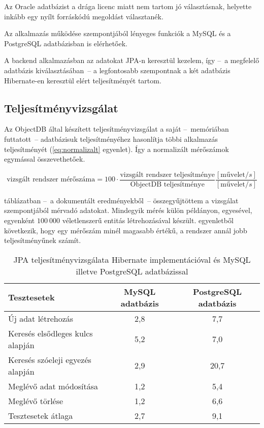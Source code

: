 Az Oracle adatbázist a drága licenc miatt nem tartom jó választásnak, helyette inkább egy nyílt forráskódú megoldást választanék.

Az alkalmazás működése szempontjából lényeges funkciók a MySQL és a PostgreSQL adatbázisban is elérhetőek.

A backend alkalmazásban az adatokat JPA-n keresztül kezelem, így --~a megfelelő adatbázis kiválasztásában~--   a legfontosabb szempontnak a két adatbázis Hibernate-en keresztül elért teljesítményét tartom.

\subsection{Teljesítményvizsgálat}
Az ObjectDB által készített teljesítményvizsgálat\cite{JPA_benchmark} a saját --~memóriában futtatott~--   adatbázisuk teljesítményéhez hasonlítja többi alkalmazás teljesítményét (\ref{eq:normalizalt} egyenlet). Így a normalizált mérőszámok egymással összevethetőek.

\begin{equation}
\textrm{vizsgált rendszer mérőszáma} = 100 \cdot
\frac{\textrm{vizsgált rendszer teljesítménye}}{\textrm{ObjectDB teljesítménye}}
\frac{[\textrm{művelet}/s]}{[\textrm{művelet}/s]}
\label{eq:normalizalt}
\end{equation}

 táblázatban --~a dokumentált eredményekből\cite{JPA_benchmark}~--   összegyűjtöttem a vizsgálat szempontjából mérvadó adatokat. Mindegyik mérés külön példányon, egyesével, egyenként $100~000$ véletlenszerű entitás létrehozásával készült.  egyenletből következik, hogy egy mérőszám minél magasabb értékű, a rendszer annál jobb teljesítményűnek számít.

\begin{table}[hbt]
	
	\begin{tabular}{lc|c}
		Tesztesetek & MySQL adatbázis & PostgreSQL adatbázis \\\hline 
		
		Új adat létrehozás & 2,8 & 7,7\\ \hline
		Keresés elsődleges kulcs alapján  & 5,2 & 7,0\\ \hline
		Keresés szóeleji egyezés alapján & 2,9 & 20,7\\ \hline
		Meglévő adat módosítása & 1,2 & 5,4\\ \hline
		Meglévő törlése & 1,2 & 6,6 \\ \hline
		Tesztesetek átlaga & 2,7 & 9,1
	\end{tabular} 
	
	\caption{JPA teljesítményvizsgálata Hibernate implementációval és  MySQL illetve PostgreSQL adatbázissal }
	\label{tabl:teljesitmenyvizsgalat}
\end{table}

